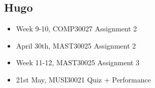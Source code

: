 \documentclass{article}
\begin{document}
\subsection{Hugo}
\begin{itemize}
    \item Week 9-10, COMP30027 Assignment 2
    \item April 30th, MAST30025 Assignment 2
    \item Week 11-12, MAST30025 Assignment 3
    \item 21st May, MUSI30021 Quiz + Performance
\end{itemize}
\end{document}

